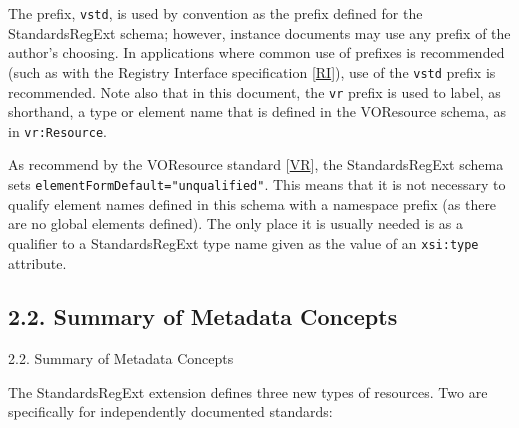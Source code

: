 \documentclass[11pt,a4paper]{ivoa}
\begin{document}
{{The prefix, \texttt{vstd}, is used by convention as the
prefix defined for the StandardsRegExt schema; however, instance documents
may use any prefix of the author's choosing.  In applications where
common use of prefixes is recommended (such as with the Registry
Interface specification [\href{#RI}{RI}]), use of the
\texttt{vstd} prefix is recommended.  Note also that in this
document, the \texttt{vr} prefix is used to label, as shorthand, a
type or element name that is defined in the VOResource schema, as in
\texttt{vr:Resource}. 



As recommend by the VOResource standard [\href{#VR}{VR}], the
StandardsRegExt schema sets \texttt{elementFormDefault="unqualified"}.
This means that it is not necessary to qualify element names defined
in this schema with a namespace prefix (as there are no global
elements defined).  The only place it is usually needed is as a
qualifier to a StandardsRegExt type name given as the value of an
\texttt{xsi:type} attribute.  



\subsection{2.2. Summary of Metadata Concepts}

\label{}

2.2. Summary of Metadata Concepts

The StandardsRegExt extension defines three new types of resources.  Two
are specifically for independently documented standards:


}}
\end{document}
